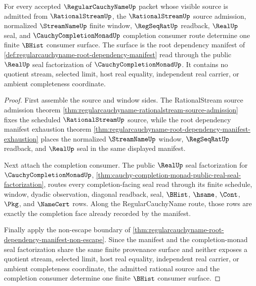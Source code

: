 \begin{theorem}
\label{thm:regularcauchyname-rationalstream-completion-seal-triangle}
For every accepted $\RegularCauchyNameUp$ packet whose visible source is admitted from $\RationalStreamUp$, the $\RationalStreamUp$ source admission, normalized $\StreamNameUp$ finite window, $\RegSeqRatUp$ readback, $\RealUp$ seal, and $\CauchyCompletionMonadUp$ completion consumer route determine one finite $\BHist$ consumer surface. The surface is the root dependency manifest of \autoref{def:regularcauchyname-root-dependency-manifest} read through the public $\RealUp$ seal factorization of $\CauchyCompletionMonadUp$. It contains no quotient stream, selected limit, host real equality, independent real carrier, or ambient completeness coordinate.
\end{theorem}
\begin{proof}
First assemble the source and window sides. The RationalStream source admission theorem \autoref{thm:regularcauchyname-rationalstream-source-admission} fixes the scheduled $\RationalStreamUp$ source, while the root dependency manifest exhaustion theorem \autoref{thm:regularcauchyname-root-dependency-manifest-exhaustion} places the normalized $\StreamNameUp$ window, $\RegSeqRatUp$ readback, and $\RealUp$ seal in the same displayed manifest.

Next attach the completion consumer. The public $\RealUp$ seal factorization for $\CauchyCompletionMonadUp$, \autoref{thm:cauchy-completion-monad-public-real-seal-factorization}, routes every completion-facing seal read through its finite schedule, window, dyadic observation, diagonal readback, seal, $\BHist$, $\hsame$, $\Cont$, $\Pkg$, and $\NameCert$ rows. Along the RegularCauchyName route, those rows are exactly the completion face already recorded by the manifest.

Finally apply the non-escape boundary of \autoref{thm:regularcauchyname-root-dependency-manifest-non-escape}. Since the manifest and the completion-monad seal factorization share the same finite provenance surface and neither exposes a quotient stream, selected limit, host real equality, independent real carrier, or ambient completeness coordinate, the admitted rational source and the completion consumer determine one finite $\BHist$ consumer surface.
\end{proof}

